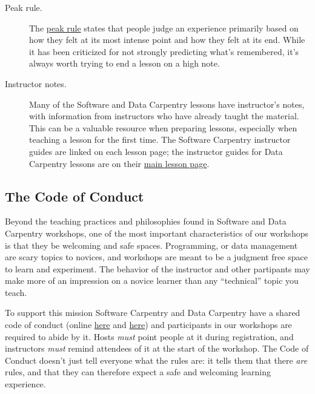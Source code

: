 \begin{description}
\item[Peak rule.] The \href{https://en.wikipedia.org/wiki/Peak\%E2\%80\%93end\_rule}{peak rule} states that
people judge an experience primarily based on how they felt at its most intense point
and how they felt at its end.
While it has been criticized for not strongly predicting what's remembered,
it's always worth trying to end a lesson on a high note.



\item[Instructor notes.] Many of the Software and Data Carpentry lessons have 
instructor's notes, with information 
from instructors who have already taught the material.  This can be a valuable 
resource when preparing lessons, especially when teaching a lesson for the first time.\newline
The Software Carpentry instructor guides are linked on each lesson page; the 
instructor guides for Data Carpentry lessons are on 
their \href{\{\{ site.dc\_site \}\}/lessons/}{main lesson page}.
\end{description}

\subsection*{The Code of Conduct}

Beyond the teaching practices and philosophies found in Software and Data 
Carpentry workshops, one of the most important characteristics of our workshops 
is that they be welcoming and safe spaces.  Programming, or data management are 
scary topics to novices, and workshops are meant to be a judgment free 
space to learn and experiment.  The behavior of the instructor and other partipants 
may make more of an impression on a novice learner than any ``technical'' topic you teach.

To support this mission
Software Carpentry and Data Carpentry have a shared code of conduct
(online \href{\{\{ site.swc\_site \}\}/conduct/}{here} and \href{\{\{ site.dc\_site \}\}/code-of-conduct/}{here})
and participants in our workshops are required to abide by it.
Hosts \emph{must} point people at it during registration,
and instructors \emph{must} remind attendees of it at the start of the workshop.
The Code of Conduct doesn't just tell everyone what the rules are:
it tells them that there \emph{are} rules,
and that they can therefore expect a safe and welcoming learning experience.

